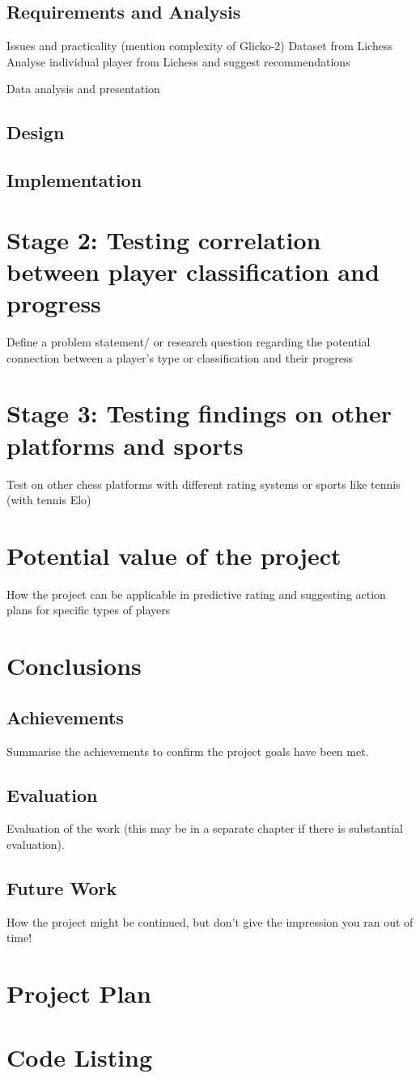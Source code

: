 \documentclass[a4paper]{article}
\begin{document}
\subsection{Requirements and Analysis}
Issues and practicality (mention complexity of Glicko-2)
Dataset from Lichess
Analyse individual player from Lichess and suggest recommendations

Data analysis and presentation

\subsection{Design}


\subsection{Implementation}


\section{Stage 2: Testing correlation between player classification and progress}
Define a problem statement/ or research question regarding the potential connection between a player's type or classification and their progress

\section{Stage 3: Testing findings on other platforms and sports}
Test on other chess platforms with different rating systems or sports like tennis (with tennis Elo)


\section{Potential value of the project}
How the project can be applicable in predictive rating and suggesting action plans for specific types of players


\section{Conclusions}
\subsection{Achievements}
Summarise the achievements to confirm the project goals have been met.

\subsection{Evaluation}
Evaluation of the work (this may be in a separate chapter if there is substantial evaluation).

\subsection{Future Work}
How the project might be continued, but don't give the impression you ran out of time!

\begin{appendices}
\section{Project Plan}

\section{Code Listing}
\end{appendices}
\end{document}
